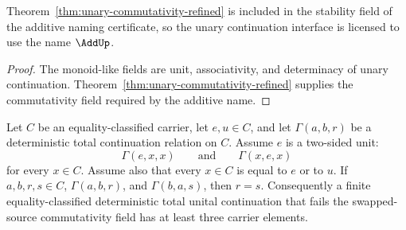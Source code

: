 \begin{corollary}
\label{cor:add-activation}
Theorem~\ref{thm:unary-commutativity-refined} is included in the stability field of the additive naming certificate, so the unary continuation interface is licensed to use the name \(\AddUp\).
\end{corollary}

\begin{proof}
The monoid-like fields are unit, associativity, and determinacy of unary continuation. Theorem~\ref{thm:unary-commutativity-refined} supplies the commutativity field required by the additive name.
\end{proof}

\begin{theorem}
\label{thm:two-element-unital-continuations-swapped-commutative}
Let \(C\) be an equality-classified carrier, let \(e,u\in C\), and let
\(\Gamma(a,b,r)\) be a deterministic total continuation relation on \(C\).
Assume \(e\) is a two-sided unit:
$$
  \Gamma(e,x,x)
  \qquad\text{and}\qquad
  \Gamma(x,e,x)
$$
for every \(x\in C\). Assume also that every \(x\in C\) is equal to \(e\) or
to \(u\). If \(a,b,r,s\in C\), \(\Gamma(a,b,r)\), and \(\Gamma(b,a,s)\), then
\(r=s\). Consequently a finite equality-classified deterministic total unital
continuation that fails the swapped-source commutativity field has at least
three carrier elements.
\end{theorem}

